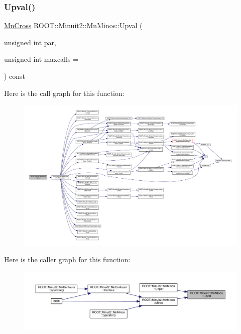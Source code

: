 \subsubsection{\texorpdfstring{Upval()}{Upval()}\hspace{0.1cm}{\footnotesize\ttfamily [1/2]}}
{\footnotesize\ttfamily \mbox{\hyperlink{classROOT_1_1Minuit2_1_1MnCross}{Mn\+Cross}} R\+O\+O\+T\+::\+Minuit2\+::\+Mn\+Minos\+::\+Upval (\begin{DoxyParamCaption}\item[{unsigned int}]{par,  }\item[{unsigned int}]{maxcalls = {} }\end{DoxyParamCaption}) const}

Here is the call graph for this function\+:\nopagebreak
\begin{figure}[H]
\begin{center}
\leavevmode
\includegraphics[width=350pt]{dc/d91/classROOT_1_1Minuit2_1_1MnMinos_a6fb073e7f84cb2d038714e362eda732a_cgraph}
\end{center}
\end{figure}
Here is the caller graph for this function\+:\nopagebreak
\begin{figure}[H]
\begin{center}
\leavevmode
\includegraphics[width=350pt]{dc/d91/classROOT_1_1Minuit2_1_1MnMinos_a6fb073e7f84cb2d038714e362eda732a_icgraph}
\end{center}
\end{figure}
\mbox{\label{classROOT_1_1Minuit2_1_1MnMinos_a6fb073e7f84cb2d038714e362eda732a}} 
